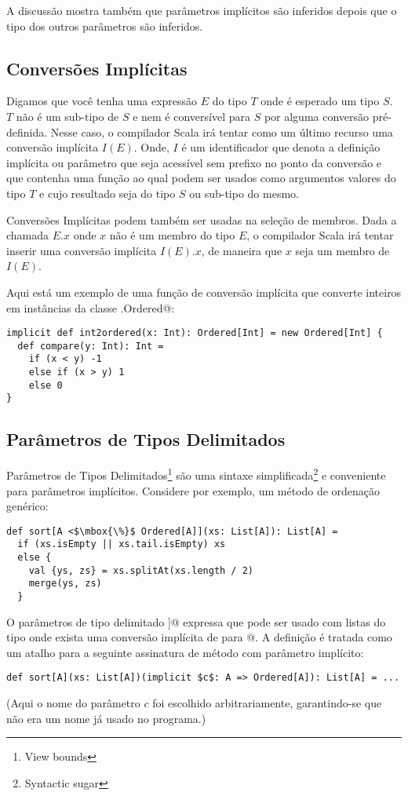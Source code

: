 A discussão mostra também que parâmetros implícitos são inferidos depois que o tipo dos outros parâmetros
são inferidos.

\subsection*{Conversões Implícitas}

Digamos que você tenha uma expressão $E$ do tipo $T$ onde é esperado um tipo
$S$. $T$ não é um sub-tipo de $S$ e nem é conversível para $S$ por alguma conversão pré-definida. 
Nesse caso, o compilador Scala irá tentar como um último recurso uma conversão implícita  $I(E)$. 
Onde, $I$ é um identificador que denota a definição implícita ou parâmetro que seja acessível sem prefixo
no ponto da conversão e que contenha uma função ao qual podem ser usados como argumentos valores do tipo  $T$ 
e cujo resultado seja do tipo $S$ ou sub-tipo do mesmo.

Conversões Implícitas podem também ser usadas na seleção de membros.
Dada a chamada $E.x$ onde $x$ não é um membro do tipo $E$, o compilador
Scala irá tentar inserir uma conversão implícita $I(E).x$, de maneira que $x$ seja um membro de $I(E)$.

Aqui está um exemplo de uma função de conversão implícita que converte 
inteiros em instâncias da classe \lstinline@scala.Ordered@:
\begin{lstlisting}
implicit def int2ordered(x: Int): Ordered[Int] = new Ordered[Int] {
  def compare(y: Int): Int =
    if (x < y) -1
    else if (x > y) 1
    else 0
}
\end{lstlisting}

\subsection*{Parâmetros de Tipos Delimitados}

Parâmetros de Tipos Delimitados\footnote{View bounds} são uma sintaxe simplificada\footnote{Syntactic sugar}
 e conveniente para parâmetros implícitos. 
Considere por exemplo, um método de ordenação genérico:
\begin{lstlisting}
def sort[A <$\mbox{\%}$ Ordered[A]](xs: List[A]): List[A] =
  if (xs.isEmpty || xs.tail.isEmpty) xs
  else {
    val {ys, zs} = xs.splitAt(xs.length / 2)
    merge(ys, zs)
  }
\end{lstlisting}
O parâmetros de tipo delimitado \lstinline@[A <$\mbox{\%}$ Ordered[A]]@
expressa que  \lstinline@sort@ pode ser usado com listas do tipo 
\lstinline@A@ onde exista uma conversão implícita de 
\lstinline@A@ para \lstinline@Ordered[A]@. A definição é tratada como um atalho para a seguinte
assinatura de método com parâmetro implícito:
\begin{lstlisting}
def sort[A](xs: List[A])(implicit $c$: A => Ordered[A]): List[A] = ...
\end{lstlisting}
(Aqui o nome do parâmetro $c$ foi escolhido arbitrariamente, garantindo-se que 
não era um nome já usado no programa.)

